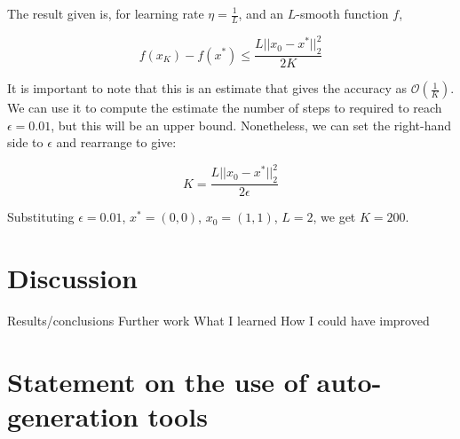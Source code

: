 \documentclass[12pt]{article}
\begin{document}
The result given is, for learning rate $\eta=\frac{1}{L}$, and an $L$-smooth function $f$,

\[f(x_K) - f(x^*) \leq \frac{L||x_0-x^*||_2^2}{2K}\]

It is important to note that this is an estimate that gives the accuracy as $\mathcal{O}(\frac{1}{K})$.
We can use it to compute the estimate the number of steps to required to reach $\epsilon=0.01$,
but this will be an upper bound.
Nonetheless, we can set the right-hand side to $\epsilon$ and rearrange to give:

\[K = \frac{L||x_0-x^*||_2^2}{2\epsilon}\]

Substituting $\epsilon=0.01$, $x^*=(0,0)$, $x_0=(1,1)$, $L=2$, we get $K=200$.

\section{Discussion}
Results/conclusions
Further work
What I learned
How I could have improved \cite{keypaper}




\appendix

\section{Statement on the use of auto-generation tools}
\end{document}
